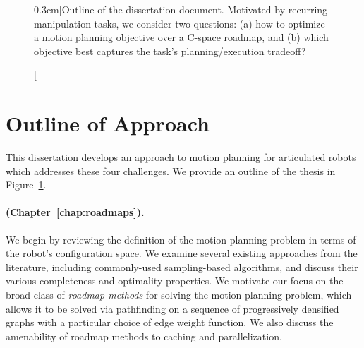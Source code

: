 \begin{figure}[t]
   \caption[][0.3cm]{Outline of the dissertation document.
      Motivated by recurring manipulation tasks,
      we consider two questions:
      (a) how to optimize a motion planning objective
      over a C-space roadmap,
      and (b) which objective best captures
      the task's planning/execution tradeoff?}

   \label{fig:intro:outline}
\end{figure}

\section{Outline of Approach}

This dissertation develops an approach to motion planning
for articulated robots
which addresses these four challenges.
We provide an outline of the thesis in Figure~\ref{fig:intro:outline}.

\paragraph{ (Chapter~\ref{chap:roadmaps}).}
We begin by reviewing the definition of the motion planning problem
in terms of the robot's configuration space.
We examine several existing approaches from the literature,
including commonly-used sampling-based algorithms,
and discuss their various completeness and optimality properties.
We motivate our focus on the broad class of \emph{roadmap methods}
for solving the motion planning problem,
which allows it to be solved via pathfinding on a sequence of
progressively densified graphs
with a particular choice of edge weight function.
We also discuss the amenability of roadmap methods
to caching and parallelization.

